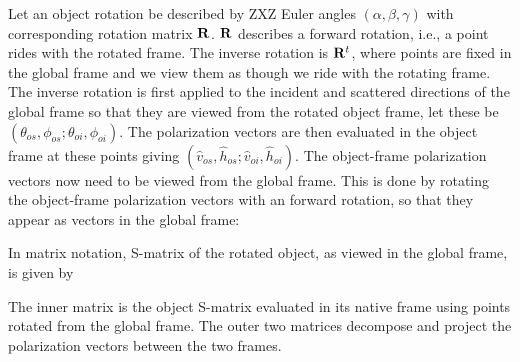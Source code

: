 %

Let an object rotation be described by ZXZ Euler angles $(\alpha,\beta,\gamma)$ with corresponding rotation matrix $\mathbf{R}$.  $\mathbf{R}$ describes a forward rotation, i.e., a point rides with the rotated frame. The inverse rotation is $\mathbf{R}^t$, where points are fixed in the global frame and we view them as though we ride with the rotating frame. The inverse rotation is first applied to the incident and scattered directions of the global frame so that they are viewed from the rotated object frame, let these be $(\theta_{os},\phi_{os};\theta_{oi},\phi_{oi})$. The polarization vectors are then evaluated in the object frame at these points giving $(\hat{v}_{os},\hat{h}_{os};\hat{v}_{oi},\hat{h}_{oi})$. The object-frame polarization vectors now need to be viewed from the global frame. This is done by rotating the object-frame polarization vectors with an forward rotation, so that they appear as vectors in the global frame:

In matrix notation, S-matrix of the rotated object, as viewed in the global frame, is given by 
 
The inner matrix is the object S-matrix evaluated in its native frame using points rotated from the global frame. The outer two matrices decompose and project the polarization vectors between the two frames. 


